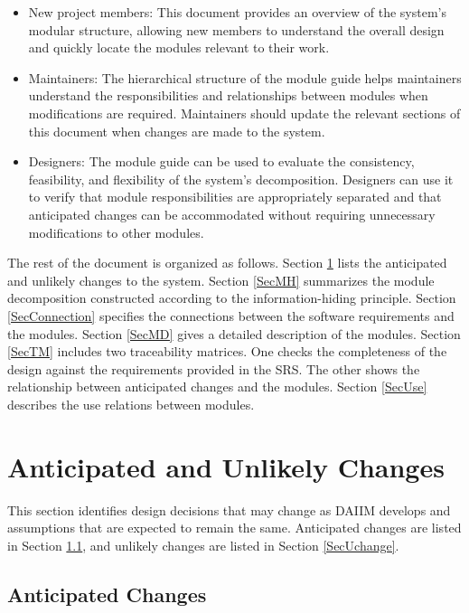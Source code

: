 \documentclass[12pt, titlepage]{article}
\begin{document}
\begin{itemize}
\item New project members: This document provides an overview of the system's modular structure, allowing new members to understand the overall design and quickly locate the modules relevant to their work.
\item Maintainers: The hierarchical structure of the module guide helps maintainers understand the responsibilities and relationships between modules when modifications are required. Maintainers should update the relevant sections of this document when changes are made to the system.
\item Designers: The module guide can be used to evaluate the consistency, feasibility, and flexibility of the system's decomposition. Designers can use it to verify that module responsibilities are appropriately separated and that anticipated changes can be accommodated without requiring unnecessary modifications to other modules.
\end{itemize}
The rest of the document is organized as follows. Section \ref{SecChange} lists the anticipated and unlikely changes to the system. Section \ref{SecMH} summarizes the module decomposition constructed according to the information-hiding principle. Section \ref{SecConnection} specifies the connections between the software requirements and the modules. Section \ref{SecMD} gives a detailed description of the modules. Section \ref{SecTM} includes two traceability matrices. One checks the completeness of the design against the requirements provided in the SRS. The other shows the relationship between anticipated changes and the modules. Section \ref{SecUse} describes the use relations between modules.

\section{Anticipated and Unlikely Changes} \label{SecChange}

This section identifies design decisions that may change as DAIIM develops and assumptions that are expected to remain the same. Anticipated changes are listed in Section \ref{SecAchange}, and unlikely changes are listed in Section \ref{SecUchange}.

\subsection{Anticipated Changes} \label{SecAchange}
\end{document}
